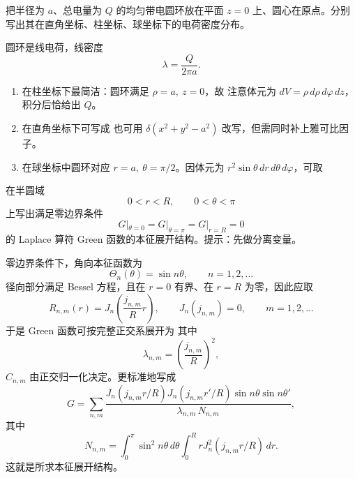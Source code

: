 \begin{question}
把半径为 $a$、总电量为 $Q$ 的均匀带电圆环放在平面 $z=0$ 上、圆心在原点。分别写出其在直角坐标、柱坐标、球坐标下的电荷密度分布。
\begin{solution}

圆环是线电荷，线密度
\[
\lambda=\frac{Q}{2\pi a}.
\]
\begin{enumerate}[label=（\arabic*）,leftmargin=2.8em,itemsep=0.2em]
\item 在柱坐标下最简洁：圆环满足 $\rho=a,\ z=0$，故
注意体元为 $dV=\rho\,d\rho\,d\varphi\,dz$，积分后恰给出 $Q$。
\item 在直角坐标下可写成
也可用 $\delta(x^2+y^2-a^2)$ 改写，但需同时补上雅可比因子。
\item 在球坐标中圆环对应 $r=a,\ \theta=\pi/2$。因体元为 $r^2\sin\theta\,dr\,d\theta\,d\varphi$，可取
\end{enumerate}
\end{solution}
\end{question}

\begin{question}
在半圆域
\[
0<r<R,\qquad 0<\theta<\pi
\]
上写出满足零边界条件
\[
G|_{\theta=0}=G|_{\theta=\pi}=G|_{r=R}=0
\]
的 Laplace 算符 Green 函数的本征展开结构。提示：先做分离变量。
\begin{solution}

零边界条件下，角向本征函数为
\[
\Theta_n(\theta)=\sin n\theta,\qquad n=1,2,\dots
\]
径向部分满足 Bessel 方程，且在 $r=0$ 有界、在 $r=R$ 为零，因此应取
\[
R_{n,m}(r)=J_n\!\left(\frac{j_{n,m}}{R}r\right),
\qquad J_n(j_{n,m})=0,
\qquad m=1,2,\dots
\]
于是 Green 函数可按完整正交系展开为
其中
\[
\lambda_{n,m}=\left(\frac{j_{n,m}}{R}\right)^2,
\]
$C_{n,m}$ 由正交归一化决定。更标准地写成
\[
G=\sum_{n,m}
\frac{J_n(j_{n,m}r/R)J_n(j_{n,m}r'/R)\sin n\theta\sin n\theta'}{
\lambda_{n,m}\,N_{n,m}},
\]
其中
\[
N_{n,m}=\int_0^{\pi}\!\sin^2 n\theta\,d\theta\int_0^R rJ_n^2(j_{n,m}r/R)\,dr.
\]
这就是所求本征展开结构。
\end{solution}
\end{question}


